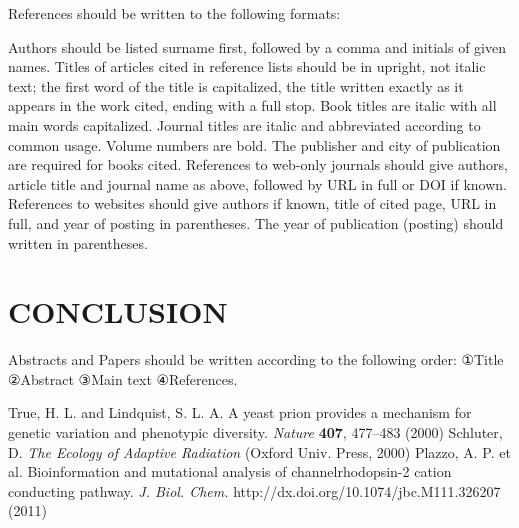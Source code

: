 \documentclass{abstract_hutech}
\begin{document}
References should be written to the following formats:

\noindent Authors should be listed surname first, followed by a comma and initials of given names. Titles of articles cited in reference lists should be in upright, not italic text; the first word of the title is capitalized, the title written exactly as it appears in the work cited, ending with a full stop. Book titles are italic with all main words capitalized. Journal titles are italic and abbreviated according to common usage. Volume numbers are bold. The publisher and city of publication are required for books cited. References to web-only journals should give authors, article title and journal name as above, followed by URL in full or DOI if known. References to websites should give authors if known, title of cited page, URL in full, and year of posting in parentheses. The year of publication (posting) should written in parentheses.

\section{CONCLUSION}

Abstracts and Papers should be written according to the following order: ①Title ②Abstract ③Main text ④References.

\begin{thebibliography}{99}
 True, H. L. and Lindquist, S. L. A. A yeast prion provides a mechanism for genetic variation and phenotypic diversity. {\it Nature} {\bf 407}, 477--483 (2000)
 Schluter, D. {\it The Ecology of Adaptive Radiation} (Oxford Univ. Press, 2000)
 Plazzo, A. P. et al. Bioinformation and mutational analysis of channelrhodopsin-2 cation conducting pathway. {\it J. Biol. Chem.} http://dx.doi.org/10.1074/jbc.M111.326207 (2011)
\end{thebibliography}
\end{document}
